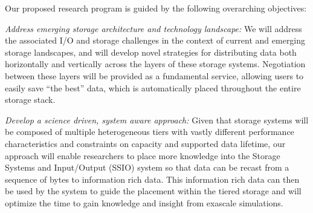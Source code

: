 % 
Our proposed research program is guided by the following overarching objectives:
\begin{tightItemize}
\item
{\em Address emerging storage architecture and technology landscape:}
We will address the associated I/O and storage challenges in the context of
current and emerging storage landscapes,
and will develop novel strategies for distributing 
data both horizontally and vertically across the layers of these storage systems.  
Negotiation between these layers will be provided as a fundamental service, allowing users to
easily save ``the best''  data, which is automatically placed throughout the
entire storage stack.
\item
{\em Develop a science driven, system aware approach:}
%
Given that storage systems will be composed of multiple heterogeneous tiers with
vastly different performance characteristics and constraints on capacity and 
supported data lifetime, our approach will enable researchers to 
place more knowledge into the Storage Systems and Input/Output (SSIO) system so that data can be recast from 
a sequence of bytes to information rich data. This information rich data can then
be used by the system to guide the  placement within the tiered storage and will optimize the time
to gain knowledge and insight from exascale simulations.



\end{tightItemize}
